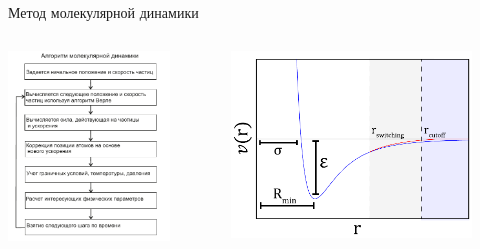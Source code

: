 \documentclass{beamer}
\begin{document}
\begin{frame}{Метод молекулярной динамики}
\footnotesize{

\begin{columns}
\begin{column}{0.4\linewidth}

\centering
    \includegraphics[width=\textwidth]{blocksheme}

\end{column}


\begin{column}{0.5\linewidth}

\begin{figure}
    \centering
    \includegraphics[width=\textwidth]{Lj-cutoff-scheme}
\end{figure}


\end{column}
\end{columns}}
\end{frame}
\end{document}
